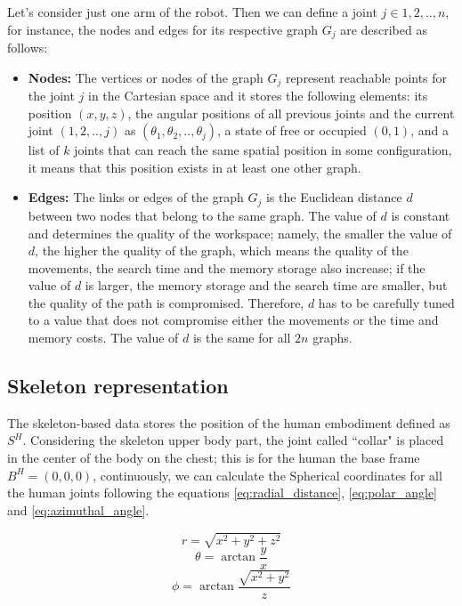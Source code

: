 \documentclass[thesis]{mas_proposal}
\begin{document}
Let's consider just one arm of the robot. Then we can define a joint $j \in {1,2,..,n}$, for instance, the nodes and edges for its respective graph $G_j$ are described as follows:

\begin{itemize}
	
	\item \textbf{Nodes:} The vertices or nodes of the graph $G_j$ represent reachable points for the joint $j$ in the Cartesian space and it stores the following elements: its position $(x, y, z)$, the angular positions of all previous joints and the current joint $(1,2,..,j)$ as $(\theta_1, \theta_2,..,\theta_j)$, a state of free or occupied $(0, 1)$, and a list of $k$ joints that can reach the same spatial position in some configuration, it means that this position exists in at least one other graph. 	
	
	\item \textbf{Edges:} The links or edges of the graph $G_j$ is the Euclidean distance $d$ between two nodes that belong to the same graph. The value of $d$ is constant and determines the quality of the workspace; namely, the smaller the value of $d$, the higher the quality of the graph, which means the quality of the movements, the search time and the memory storage also increase; if the value of $d$ is larger, the memory storage and the search time are smaller, but the quality of the path is compromised. Therefore, $d$ has to be carefully tuned to a value that does not compromise either the movements or the time and memory costs. The value of $d$ is the same for all $2n$ graphs.
	
\end{itemize}  

\subsection{Skeleton representation}
	The skeleton-based data stores the position of the human embodiment defined as $S^H$. Considering the skeleton upper body part, the joint called ``collar" is placed in the center of the body on the chest; this is for the human the base frame $B^H = (0, 0, 0)$, continuously, we can calculate the Spherical coordinates for all the human joints following the equations \ref{eq:radial_distance}, \ref{eq:polar_angle} and \ref{eq:azimuthal_angle}.

\begin{equation}
	r = \sqrt{x^2 + y^2 + z^2}
	\label{eq:radial_distance}
	\end{equation}
	\begin{equation}
	\theta = \arctan \frac{y}{x}
	\label{eq:polar_angle}
	\end{equation}
	\begin{equation}
	\phi = \arctan \frac{\sqrt{x^2 + y^2}}{z}
	\label{eq:azimuthal_angle}
\end{equation}
\end{document}
